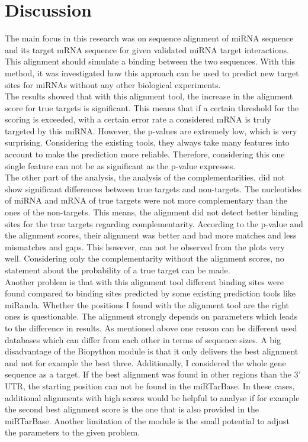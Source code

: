 \documentclass[11pt,  a4paper]{report}
\begin{document}
\chapter{Discussion}
\label{chapter:discussion}

The main focus in this research was on sequence alignment of miRNA sequence and its target mRNA sequence for given validated miRNA target interactions. This alignment should simulate a binding between the two sequences. With this method, it was investigated how this approach can be used to predict new target sites for miRNAs without any other biological experiments.\\

The results showed that with this alignment tool, the increase in the alignment score for true targets is significant. This means that if a certain threshold for the scoring is exceeded, with a certain error rate a considered mRNA is truly targeted by this miRNA. However, the p-values are extremely low, which is very surprising. Considering the existing tools, they always take many features into account to make the prediction more reliable. Therefore, considering this one single feature can not be as significant as the p-value expresses.\\

The other part of the analysis, the analysis of the complementarities, did not show significant differences between true targets and non-targets. The nucleotides of miRNA and mRNA of true targets were not more complementary than the ones of the non-targets. This means, the alignment did not detect better binding sites for the true targets regarding complementarity. According to the p-value and the alignment scores, their alignment was better and had more matches and less mismatches and gaps. This however, can not be observed from the plots very well. Considering only the complementarity without the alignment scores, no statement about the probability of a true target can be made. \\

Another problem is that with this alignment tool different binding sites were found compared to binding sites predicted by some existing prediction tools like miRanda. Whether the positions I found with the alignment tool are the right ones is questionable. The alignment strongly depends on parameters which leads to the difference in results. As mentioned above one reason can be different used databases which can differ from each other in terms of sequence sizes. A big disadvantage of the Biopython module is that it only delivers the best alignment and not for example the best three. Additionally, I considered the whole gene sequence as a target. If the best alignment was found in other regions than the 3' UTR, the starting position can not be found in the miRTarBase. In these cases, additional alignments with high scores would be helpful to analyse if for example the second best alignment score is the one that is also provided in the miRTarBase. Another limitation of the module is the small potential to adjust the parameters to the given problem. \\
\end{document}
